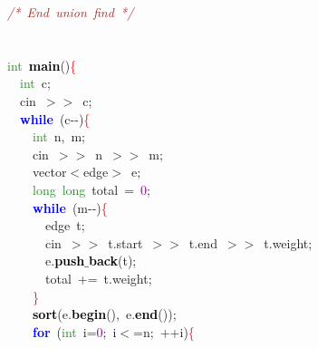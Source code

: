 {{\mbox{}\textit{\textcolor{Brown}{/*\ End\ union\ find\ */}} \\
\mbox{} \\
\mbox{} \\
\mbox{}\textcolor{ForestGreen}{int}\ \textbf{\textcolor{Black}{main}}\textcolor{BrickRed}{()}\textcolor{Red}{\{} \\
\mbox{}\ \ \textcolor{ForestGreen}{int}\ c\textcolor{BrickRed}{;} \\
\mbox{}\ \ cin\ \textcolor{BrickRed}{$>$$>$}\ c\textcolor{BrickRed}{;} \\
\mbox{}\ \ \textbf{\textcolor{Blue}{while}}\ \textcolor{BrickRed}{(}c\textcolor{BrickRed}{-\/-)}\textcolor{Red}{\{} \\
\mbox{}\ \ \ \ \textcolor{ForestGreen}{int}\ n\textcolor{BrickRed}{,}\ m\textcolor{BrickRed}{;} \\
\mbox{}\ \ \ \ cin\ \textcolor{BrickRed}{$>$$>$}\ n\ \textcolor{BrickRed}{$>$$>$}\ m\textcolor{BrickRed}{;} \\
\mbox{}\ \ \ \ vector\textcolor{BrickRed}{$<$}edge\textcolor{BrickRed}{$>$}\ e\textcolor{BrickRed}{;} \\
\mbox{}\ \ \ \ \textcolor{ForestGreen}{long}\ \textcolor{ForestGreen}{long}\ total\ \textcolor{BrickRed}{=}\ \textcolor{Purple}{0}\textcolor{BrickRed}{;} \\
\mbox{}\ \ \ \ \textbf{\textcolor{Blue}{while}}\ \textcolor{BrickRed}{(}m\textcolor{BrickRed}{-\/-)}\textcolor{Red}{\{} \\
\mbox{}\ \ \ \ \ \ edge\ t\textcolor{BrickRed}{;} \\
\mbox{}\ \ \ \ \ \ cin\ \textcolor{BrickRed}{$>$$>$}\ t\textcolor{BrickRed}{.}start\ \textcolor{BrickRed}{$>$$>$}\ t\textcolor{BrickRed}{.}end\ \textcolor{BrickRed}{$>$$>$}\ t\textcolor{BrickRed}{.}weight\textcolor{BrickRed}{;} \\
\mbox{}\ \ \ \ \ \ e\textcolor{BrickRed}{.}\textbf{\textcolor{Black}{push$\_$back}}\textcolor{BrickRed}{(}t\textcolor{BrickRed}{);} \\
\mbox{}\ \ \ \ \ \ total\ \textcolor{BrickRed}{+=}\ t\textcolor{BrickRed}{.}weight\textcolor{BrickRed}{;} \\
\mbox{}\ \ \ \ \textcolor{Red}{\}} \\
\mbox{}\ \ \ \ \textbf{\textcolor{Black}{sort}}\textcolor{BrickRed}{(}e\textcolor{BrickRed}{.}\textbf{\textcolor{Black}{begin}}\textcolor{BrickRed}{(),}\ e\textcolor{BrickRed}{.}\textbf{\textcolor{Black}{end}}\textcolor{BrickRed}{());} \\
\mbox{}\ \ \ \ \textbf{\textcolor{Blue}{for}}\ \textcolor{BrickRed}{(}\textcolor{ForestGreen}{int}\ i\textcolor{BrickRed}{=}\textcolor{Purple}{0}\textcolor{BrickRed}{;}\ i\textcolor{BrickRed}{$<$=}n\textcolor{BrickRed}{;}\ \textcolor{BrickRed}{++}i\textcolor{BrickRed}{)}\textcolor{Red}{\{} \\
}}

